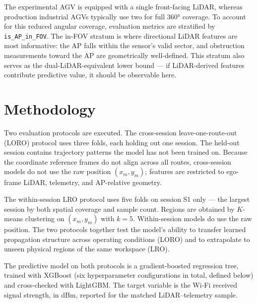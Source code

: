 \documentclass[conference]{IEEEtran}
\begin{document}
The experimental AGV is equipped with a single front-facing LiDAR, whereas production industrial AGVs typically use two for full 360° coverage. To account for this reduced angular coverage, evaluation metrics are stratified by \texttt{is\_AP\_in\_FOV}. The in-FOV stratum is where directional LiDAR features are most informative: the AP falls within the sensor's valid sector, and obstruction measurements toward the AP are geometrically well-defined. This stratum also serves as the dual-LiDAR-equivalent lower bound — if LiDAR-derived features contribute predictive value, it should be observable here.


\section{Methodology}
\label{sec:method}

Two evaluation protocols are executed. The cross-session leave-one-route-out (LORO) protocol uses three folds, each holding out one session. The held-out session contains trajectory patterns the model has not been trained on. Because the coordinate reference frames do not align across all routes, cross-session models do not use the raw position $(x_m, y_m)$; features are restricted to ego-frame LiDAR, telemetry, and AP-relative geometry.

The within-session LRO protocol uses five folds on session S1 only --- the largest session by both spatial coverage and sample count. Regions are obtained by $K$-means clustering on $(x_m, y_m)$ with $k = 5$. Within-session models do use the raw position. The two protocols together test the model's ability to transfer learned propagation structure across operating conditions (LORO) and to extrapolate to unseen physical regions of the same workspace (LRO).

The predictive model on both protocols is a gradient-boosted regression tree, trained with XGBoost (six hyperparameter configurations in total, defined below) and cross-checked with LightGBM. The target variable is the Wi\nobreakdash-Fi received signal strength, in dBm, reported for the matched LiDAR--telemetry sample.
\end{document}
